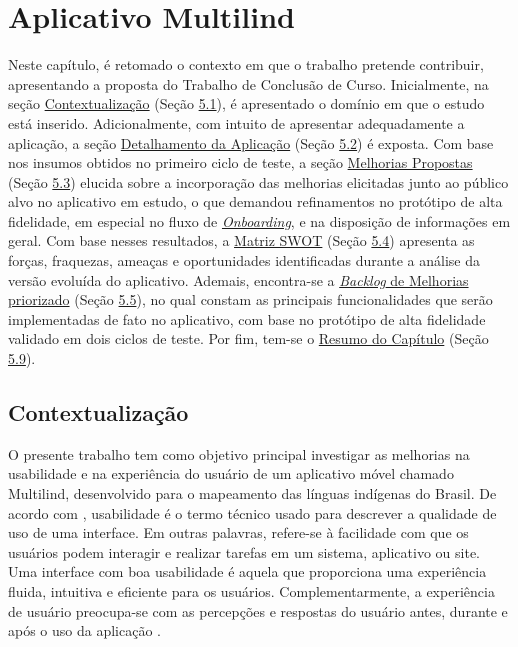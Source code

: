 \chapter[Aplicativo Multilind]{Aplicativo Multilind}
\label{chap:Aplicativo Multilind}
Neste capítulo, é retomado o contexto em que o trabalho pretende contribuir, apresentando a proposta do Trabalho de Conclusão de Curso. Inicialmente, na seção \hyperref[sec:Contextualizacao]{Contextualização} (Seção \hyperref[sec:Contextualizacao]{5.1}), é 
apresentado o domínio em que o estudo está inserido. Adicionalmente, com intuito de apresentar adequadamente a aplicação, a seção \hyperref[sec:Detalhamento da Aplicacao]{Detalhamento da Aplicação} (Seção \hyperref[sec:Detalhamento da Aplicacao]{5.2}) é exposta. 
Com base nos insumos obtidos no primeiro ciclo de teste, a seção \hyperref[sec:Melhorias Propostas]{Melhorias Propostas} (Seção \hyperref[sec:Melhorias Propostas]{5.3}) elucida sobre a incorporação das melhorias elicitadas junto ao público 
alvo no aplicativo em estudo, o que demandou refinamentos no protótipo de alta fidelidade, em especial no fluxo de \hyperref[sec:Onboarding]{\textit{Onboarding}}, e na disposição de informações em geral. Com base nesses resultados, a \hyperref[sec:Matriz SWOT]{Matriz SWOT} (Seção \hyperref[sec:Matriz SWOT]{5.4}) apresenta as forças, fraquezas, 
ameaças e oportunidades identificadas durante a análise da versão evoluída do aplicativo. Ademais, encontra-se a \hyperref[sec:Backlog de Melhorias]{\textit{Backlog} de Melhorias priorizado} (Seção \hyperref[sec:Backlog de Melhorias]{5.5}), no qual constam as principais funcionalidades que serão implementadas 
de fato no aplicativo, com base no protótipo de alta fidelidade validado em dois ciclos de teste. Por fim, tem-se o \hyperref[sec:Resumo Proposta]{Resumo do Capítulo} (Seção \hyperref[sec:Resumo Proposta]{5.9}).

\section{Contextualização}
\label{sec:Contextualizacao}
O presente trabalho tem como objetivo principal investigar as melhorias na usabilidade e na experiência do usuário de um aplicativo móvel chamado Multilind, desenvolvido para o mapeamento das línguas indígenas do Brasil. 
De acordo com , usabilidade é o termo técnico usado para descrever a qualidade de uso de uma interface. Em outras palavras, refere-se à facilidade com que os usuários podem interagir e realizar 
tarefas em um sistema, aplicativo ou site. Uma interface com boa usabilidade é aquela que proporciona uma experiência fluida, intuitiva e eficiente para os usuários. Complementarmente, a experiência de usuário preocupa-se 
com as percepções e respostas do usuário antes, durante e após o uso da aplicação \cite{iso9241210}.

